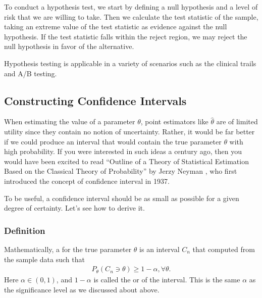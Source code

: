 \documentclass[letterpaper,11pt,english]{sphinxmanual}
\begin{document}
To conduct a hypothesis test, we start by defining a null hypothesis and
a level of risk that we are willing to take. Then we calculate the test
statistic of the sample, taking an extreme value of the test statistic
as evidence against the null hypothesis. If the test statistic falls
within the reject region, we may reject the null hypothesis in favor of
the alternative.

Hypothesis testing is applicable in a variety of scenarios such as the
clinical trails and A/B testing.


\subsection{Constructing Confidence Intervals}
\label{\detokenize{chapter_appendix_math/statistics:constructing-confidence-intervals}}
When estimating the value of a parameter \(\theta\), point
estimators like \(\hat \theta\) are of limited utility since they
contain no notion of uncertainty. Rather, it would be far better if we
could produce an interval that would contain the true parameter
\(\theta\) with high probability. If you were interested in such
ideas a century ago, then you would have been excited to read “Outline
of a Theory of Statistical Estimation Based on the Classical Theory of
Probability” by Jerzy Neyman , who first introduced
the concept of confidence interval in 1937.

To be useful, a confidence interval should be as small as possible for a
given degree of certainty. Let’s see how to derive it.


\subsubsection{Definition}
\label{\detokenize{chapter_appendix_math/statistics:definition}}
Mathematically, a  for the true parameter
\(\theta\) is an interval \(C_n\) that computed from the sample
data such that
\begin{equation}\label{equation:chapter_appendix_math/statistics:eq_confidence}
\begin{split}P_{\theta} (C_n \ni \theta) \geq 1 - \alpha, \forall \theta.\end{split}
\end{equation}
Here \(\alpha \in (0, 1)\), and \(1 - \alpha\) is called the
 or  of the interval. This is the same
\(\alpha\) as the significance level as we discussed about above.
\end{document}
